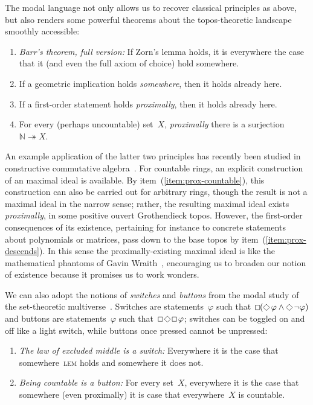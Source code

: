 \documentclass[oneside,reqno]{amsart}
\theoremstyle{definition}
\theoremstyle{plain}
\theoremstyle{remark}
\newcommand{\NN}{\mathbb{N}}
\renewcommand{\_}{\mathpunct{.}\,}
\DeclareMathOperator{\possible}{\text{\tikz[scale=.6ex/1cm,baseline=-.6ex,rotate=45,line width=.1ex]{\draw (-1,-1) rectangle (1,1);}}}
\DeclareMathOperator{\necessary}{\text{\tikz[scale=.6ex/1cm,baseline=-.6ex,line width=.1ex]{\draw (-1,-1) rectangle (1,1);}}}
\newcommand{\?}{\,{:}\,}
\begin{document}
The modal language not only allows us to recover classical principles
as above, but also renders some powerful theorems about the topos-theoretic
landscape smoothly accessible:
\begin{enumerate}
\addtocounter{enumi}{7}
\item \emph{Barr's theorem, full version:} If Zorn's lemma holds, it is
everywhere the case that it (and even the full axiom of choice) hold somewhere.
\item If a geometric implication holds \emph{somewhere}, then it holds already here.
\item \label{item:prox-descends}
If a first-order statement holds \emph{proximally}, then it holds already here.
\item \label{item:prox-countable}
For every (perhaps uncountable) set~$X$, \emph{proximally} there is a
surjection~$\NN \twoheadrightarrow X$.
\end{enumerate}
An example application of the latter two principles
has recently been studied in constructive
commutative algebra~\cite{blechschmidt-schuster:constructive-maximal-ideals}.
For countable rings, an explicit construction of an maximal ideal is available.
By item~(\ref{item:prox-countable}), this construction can also be carried out
for arbitrary rings, though the result is not a maximal ideal in the narrow
sense; rather, the resulting maximal ideal exists \emph{proximally}, in some
positive ouvert Grothendieck topos. However, the first-order consequences of
its existence, pertaining for instance to concrete statements about polynomials
or matrices, pass down to the base topos by item~(\ref{item:prox-descends}).
In this sense the proximally-existing maximal ideal is like the mathematical
phantoms of Gavin Wraith~\cite{xxx}, encouraging us to broaden our notion of
existence because it promises us to work wonders.

We can also adopt the notions of \emph{switches} and \emph{buttons} from the
modal study of the set-theoretic multiverse~\cite[xxx]{xxx}. Switches are
statements~$\varphi$ such that~$\necessary(\possible\varphi \wedge
\possible\neg\varphi)$ and buttons are statements~$\varphi$ such
that~$\necessary\possible\necessary\varphi$; switches can be toggled on and off
like a light switch, while buttons once pressed cannot be unpressed:
\begin{enumerate}
\addtocounter{enumi}{10}
\item \emph{The law of excluded middle is a switch:} Everywhere it is the case
that somewhere~\textsc{lem} holds and somewhere it does not.
\item \emph{Being countable is a button:} For every set~$X$, everywhere it is
the case that somewhere (even proximally) it is case that everywhere~$X$ is
countable.
\end{enumerate}
\end{document}
